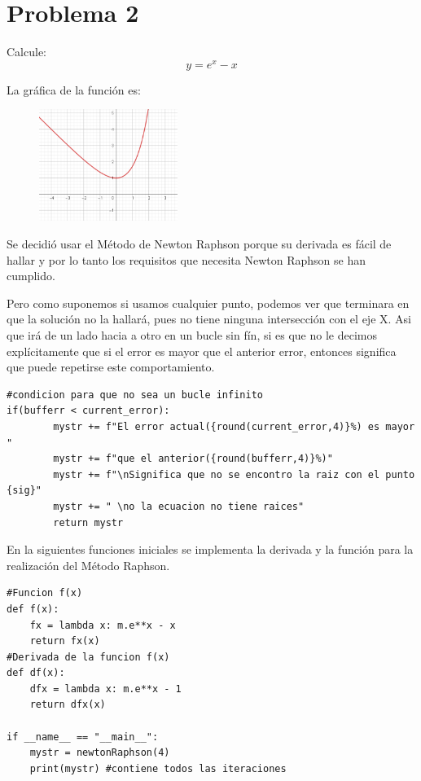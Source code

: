 \documentclass[a4paper,12pt]{article}
\begin{document}
    \section{Problema 2}
    Calcule:
    \begin{equation}
        y = e^x - x        
    \end{equation}

    La gráfica de la función es:
    \begin{figure}[h]
        \centering
        \includegraphics[width=0.4\textwidth]{f2.PNG}
    \end{figure}

    Se decidió usar 
    el Método de Newton Raphson porque su derivada es fácil 
    de hallar y por lo tanto los requisitos que necesita Newton Raphson se han cumplido.

    Pero como suponemos si usamos cualquier punto, podemos ver que terminara en 
    que la solución no la hallará, pues no tiene ninguna intersección con el eje X.
    Asi que irá de un lado hacia a otro en un bucle sin fín, si es que no le decimos explícitamente
    que si el error es mayor que el anterior error, entonces significa que puede repetirse este comportamiento.

\begin{lstlisting}
#condicion para que no sea un bucle infinito
if(bufferr < current_error):
        mystr += f"El error actual({round(current_error,4)}%) es mayor "
        mystr += f"que el anterior({round(bufferr,4)}%)"
        mystr += f"\nSignifica que no se encontro la raiz con el punto {sig}"
        mystr += " \no la ecuacion no tiene raices"
        return mystr
\end{lstlisting}    
En la siguientes funciones iniciales se implementa 
la derivada y la función para la realización del Método Raphson.
\begin{lstlisting}
#Funcion f(x)
def f(x):
    fx = lambda x: m.e**x - x
    return fx(x)
#Derivada de la funcion f(x)
def df(x):
    dfx = lambda x: m.e**x - 1
    return dfx(x)

if __name__ == "__main__":
    mystr = newtonRaphson(4)
    print(mystr) #contiene todos las iteraciones
\end{lstlisting}
\end{document}
